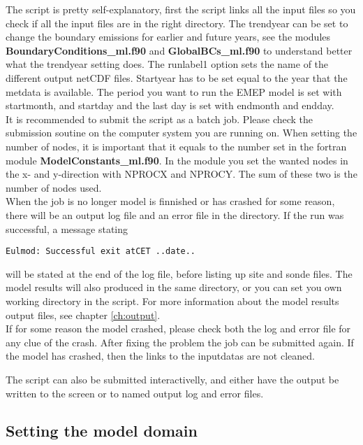The script is pretty self-explanatory, first the script links 
all the input files so you check if all the input files are in 
the right directory. 
The trendyear can be set to change the boundary emissions for 
earlier and future years, see the modules {\bf BoundaryConditions\_ml.f90 } 
and {\bf GlobalBCs\_ml.f90 } to understand better what the trendyear 
setting does. 
The runlabel1 option sets the name of the different output netCDF 
files. 
Startyear has to be set equal to the year 
that the metdata is available. The period you want to run the 
EMEP model is set with startmonth, and startday and the last day is 
set with endmonth and endday. \\

It is recommended to submit the script as a batch job. Please check the submission soutine 
on the computer system you are running on. 
When setting the number of nodes, it is important that it equals to the number set in the fortran module 
{\bf ModelConstants\_ml.f90}. In the module you set the wanted nodes in the x- and y-direction with NPROCX and 
NPROCY. The sum of these two is the number of nodes used. \\

When the job is no longer model is finnished or has crashed for some reason, there will be an output log file and 
an error file in the directory. If the run was successful, a message stating 
\begin{verbatim}
Eulmod: Successful exit atCET ..date..
\end{verbatim}
will be stated at the end of the log file, before listing up site and sonde files. 
The model results will also produced in the same directory, or you can set you own working directory in 
the script. For more information about the model results output files, see chapter \ref{ch:output}.\\

If for some reason 
the model crashed, please check both the log and error file for any clue of the crash. After fixing the 
problem the job can be submitted again. If the model has crashed, then the links to the inputdatas are not cleaned. 

The script can also be submitted interactivelly, and either have the output be written to the screen or to 
named output log and error files. 
 


\subsection{Setting the model domain}

